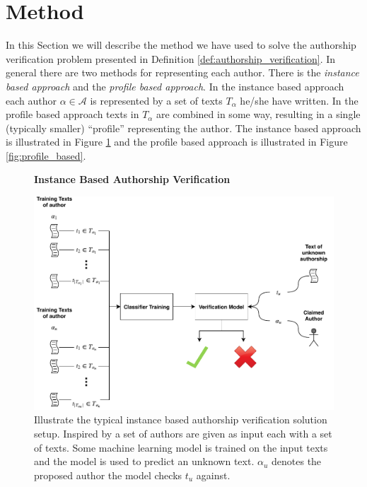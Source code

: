 \section{Method} \label{sec:method}

In this Section we will describe the method we have used to solve the authorship
verification problem presented in Definition \ref{def:authorship_verification}.
In general there are two methods for representing each author. There is the
\textit{instance based approach} and the \textit{profile based approach}. In
the instance based approach each author $\alpha \in \mathcal{A}$ is represented
by a set of texts $T_\alpha$ he/she have written. In the profile based approach
texts in $T_\alpha$ are combined in some way, resulting in a single (typically
smaller) ``profile'' representing the author. The instance based approach is
illustrated in Figure \ref{fig:instance_based} and the profile based approach is
illustrated in Figure \ref{fig:profile_based}.

\begin{figure}[htb]
    \centering
    \textbf{Instance Based Authorship Verification}\par\medskip
    \includegraphics[width=\textwidth]{./pictures/method/instance_based}
    \caption{Illustrate the typical instance based authorship verification
    solution setup. Inspired by \citet{stamatos2009} a set of authors are given
    as input each with a set of texts. Some machine learning model is trained on
    the input texts and the model is used to predict an unknown text. $\alpha_u$
    denotes the proposed author the model checks $t_u$ against.}
    \label{fig:instance_based}
\end{figure}


